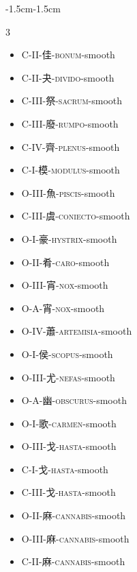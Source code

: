 \begin{adjustwidth}{-1.5cm}{-1.5cm}
\begin{multicols}{3}
\begin{itemize}[label={}, leftmargin=*]
  \item C-II-佳-\textsc{bonum}-smooth \hfill {}
  \item C-II-夬-\textsc{divido}-smooth \hfill {}
  \item C-III-祭-\textsc{sacrum}-smooth \hfill {}
  \item C-III-廢-\textsc{rumpo}-smooth \hfill {}

  \item C-IV-齊-\textsc{plenus}-smooth \hfill {}
  \item C-I-模-\textsc{modulus}-smooth \hfill {}
  \item O-III-魚-\textsc{piscis}-smooth \hfill {}
  \item C-III-虞-\textsc{coniecto}-smooth \hfill {}

  \item O-I-豪-\textsc{hystrix}-smooth \hfill {}
  \item O-II-肴-\textsc{caro}-smooth \hfill {}
  \item O-III-宵-\textsc{nox}-smooth \hfill {}
  \item O-A-宵-\textsc{nox}-smooth \hfill {}

  \item O-IV-蕭-\textsc{artemisia}-smooth \hfill {}
  \item O-I-侯-\textsc{scopus}-smooth \hfill {}
  \item O-III-尤-\textsc{nefas}-smooth \hfill {}
  \item O-A-幽-\textsc{obscurus}-smooth \hfill {}

  \item O-I-歌-\textsc{carmen}-smooth \hfill {}
  \item O-III-戈-\textsc{hasta}-smooth \hfill {}
  \item C-I-戈-\textsc{hasta}-smooth \hfill {}
  \item C-III-戈-\textsc{hasta}-smooth \hfill {}

  \item O-II-麻-\textsc{cannabis}-smooth \hfill {}
  \item O-III-麻-\textsc{cannabis}-smooth \hfill {}
  \item C-II-麻-\textsc{cannabis}-smooth \hfill {}
\end{itemize}
\end{multicols}
\end{adjustwidth}

